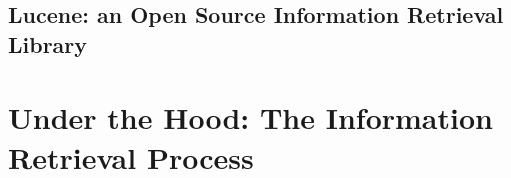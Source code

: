 \documentclass[a4paper]{usiinfbachelorproject}
\begin{document}
\subsection{Lucene: an Open Source Information Retrieval Library} \label{sec:archLucene}

\section{\textbf{Under the Hood: The Information Retrieval Process}} \label{sec:ir}


\newpage
	


\end{document}
